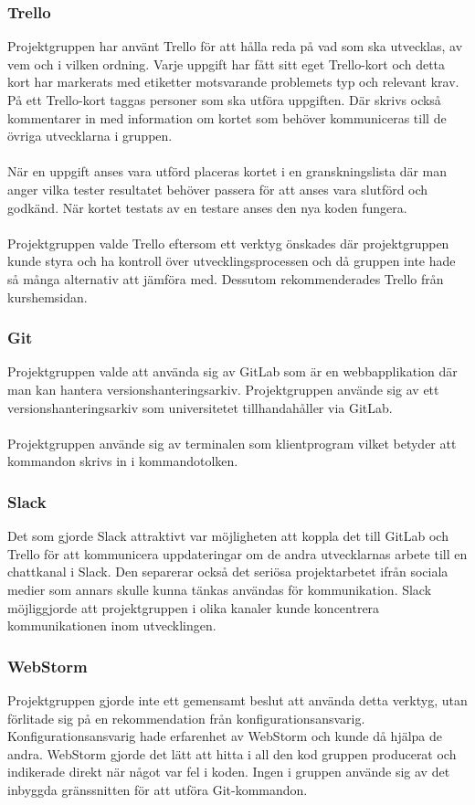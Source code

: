 \subsubsection{Trello}
Projektgruppen har använt Trello för att hålla reda på vad som ska utvecklas, av vem och i vilken ordning. Varje uppgift har fått sitt eget Trello-kort och detta kort har markerats med etiketter motsvarande problemets typ och relevant krav. På ett Trello-kort taggas personer som ska utföra uppgiften. Där skrivs också kommentarer in med information om kortet som behöver kommuniceras till de övriga utvecklarna i gruppen.
\\\\
När en uppgift anses vara utförd placeras kortet i en granskningslista där man anger vilka tester resultatet behöver passera för att anses vara slutförd och godkänd. När kortet testats av en testare anses den nya koden fungera.
\\\\
Projektgruppen valde Trello eftersom ett verktyg önskades där projektgruppen kunde styra och ha kontroll över utvecklingsprocessen och då gruppen inte hade så många alternativ att jämföra med. Dessutom rekommenderades Trello från kurshemsidan.

\subsubsection{Git}
Projektgruppen valde att använda sig av GitLab som är en webbapplikation där man kan hantera versionshanteringsarkiv. Projektgruppen använde sig av ett versionshanteringsarkiv som universitetet tillhandahåller via GitLab.
\\\\
Projektgruppen använde sig av terminalen som klientprogram vilket betyder att kommandon skrivs in i kommandotolken.

\subsubsection{Slack}
Det som gjorde Slack attraktivt var möjligheten att koppla det till GitLab och Trello för att kommunicera uppdateringar om de andra utvecklarnas arbete till en chattkanal i Slack. Den separerar också det seriösa projektarbetet ifrån sociala medier som annars skulle kunna tänkas användas för kommunikation. Slack möjliggjorde att projektgruppen i olika kanaler kunde koncentrera kommunikationen inom utvecklingen.

\subsubsection{WebStorm}
Projektgruppen gjorde inte ett gemensamt beslut att använda detta verktyg, utan förlitade sig på en rekommendation från konfigurationsansvarig. Konfigurationsansvarig hade erfarenhet av WebStorm och kunde då hjälpa de andra. WebStorm gjorde det lätt att hitta i all den kod gruppen producerat och indikerade direkt när något var fel i koden. Ingen i gruppen använde sig av det inbyggda gränssnitten för att utföra Git-kommandon.

